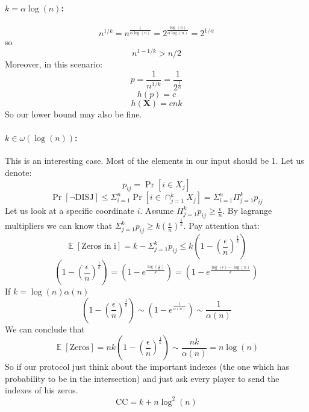 \documentclass{article}
\newcommand{\rv}[1]{\mathbf{#1}}
\theoremstyle{plain}
\begin{document}
\paragraph{$k = \alpha\log(n)$:}
\begin{equation*}
    n^{1/k} = n^{\frac{1}{\alpha\log(n)}} = 2^{\frac{\log(n)}{\alpha\log(n)}} = 2^{1/\alpha}
\end{equation*}
so
\begin{equation*}
    n^{1-1/k} > n/2
\end{equation*}
Moreover, in this scenario:
\begin{equation*}
    p = \frac{1}{n^{1/k}} = \frac{1}{2^{\frac{1}{\alpha}}} 
\end{equation*}
\begin{equation*}
    h(p) = c 
\end{equation*}
\begin{equation*}
    h(\rv{X}) = cnk
\end{equation*}
So our lower bound may also be fine.
\paragraph{$k \in \omega(\log(n))$:}
This is an interesting case. Most of the elements in our input should be 1. 
Let us denote:
\begin{equation*}
    p_{ij} = \Pr[i \in X_j]
\end{equation*}
\begin{equation*}
    \Pr[\neg \text{DISJ}] \leq \Sigma_{i=1}^{n}\Pr[i \in \cap_{j=1}^{k}X_j] = \Sigma_{i=1}^{n}\Pi_{j=1}^{k}p_{ij}
\end{equation*}
Let us look at a specific coordinate $i$. Assume $\Pi_{j=1}^{k}p_{ij} \geq \frac{\epsilon}{n}$.
By lagrange multipliers we can know that $\Sigma_{j=1}^{k}p_{ij} \geq k(\frac{\epsilon}{n})^{\frac{1}{k}}$.
Pay attention that:
\begin{equation*}
    \mathop{\mathbb{E}}[\text{Zeros in i}] = k - \Sigma_{j=1}^{k}p_{ij} \leq k \left(1 - \left(\frac{\epsilon}{n}\right)^{\frac{1}{k}}\right)
\end{equation*}
\begin{equation*}
    \left(1 - \left(\frac{\epsilon}{n}\right)^{\frac{1}{k}}\right) = \left(1 - e^{\frac{\log(\frac{\epsilon}{n})}{k}}\right) = \left(1 - e^{\frac{\log(\epsilon) -\log(n)}{k}}\right)
\end{equation*}
If $k = \log(n) \alpha(n)$
\begin{equation*}
    \left(1 - \left(\frac{\epsilon}{n}\right)^{\frac{1}{k}}\right) \sim \left(1 - e^{\frac{1}{\alpha(n)}}\right) \sim \frac{1}{\alpha(n)}
\end{equation*}
We can conclude that
\begin{equation*}
    \mathop{\mathbb{E}}[\text{Zeros}] = nk\left(1 - \left(\frac{\epsilon}{n}\right)^{\frac{1}{k}}\right) \sim \frac{nk}{\alpha(n)} = n\log(n)
\end{equation*}
So if our protocol just think about the important indexes (the one which has probability to be in the intersection) and just ask every player to send the indexes of his zeros.
\begin{equation*}
    \text{CC} = k + n\log^2(n)
\end{equation*}
\end{document}
